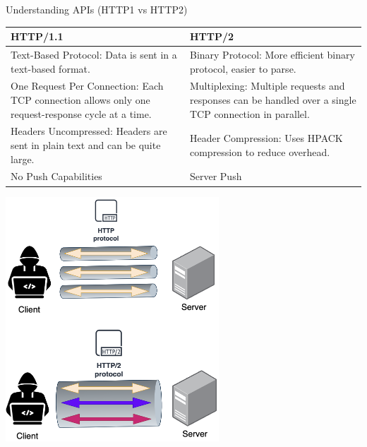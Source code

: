 \documentclass{beamer}
\begin{document}
\begin{frame}[fragile,t]{Understanding APIs \small (HTTP1 vs HTTP2)}  
	\begin{table}[t]
	\tiny
	\centering
		\begin{tabular}{  | >{\centering\arraybackslash}m{5cm} | >{\centering\arraybackslash}m{5cm} | }
		\hline
		\textbf{HTTP/1.1} & \textbf{HTTP/2} \\
		\hline
		Text-Based Protocol: Data is sent in a text-based format. & Binary Protocol: More efficient binary protocol, easier to parse. \\
		\hline
		One Request Per Connection: Each TCP connection allows only one request-response cycle at a time. & Multiplexing: Multiple requests and responses can be handled over a single TCP connection in parallel. \\
		\hline
		Headers Uncompressed: Headers are sent in plain text and can be quite large. & Header Compression: Uses HPACK compression to reduce overhead. \\
		\hline
		No Push Capabilities & Server Push \\
		\hline
		\end{tabular}
		\end{table}
    \begin{center}
      \includegraphics[width=0.6\textwidth, height=0.57\textheight]{img/http1-http2.png}
    \end{center}
  
\end{frame}
\end{document}
